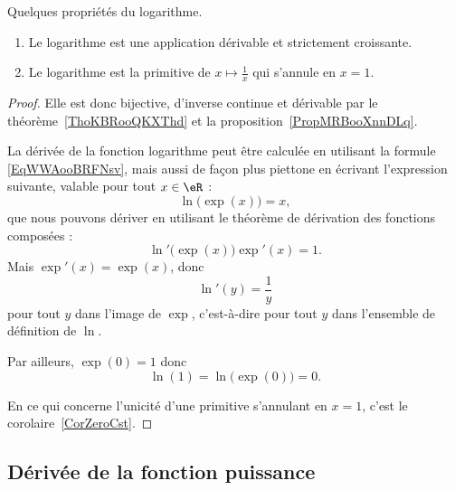 \begin{proposition}\label{ExZLMooMzYqfK}
    Quelques propriétés du logarithme.
    \begin{enumerate}
        \item
            Le logarithme est une application dérivable et strictement croissante.
        \item
            Le logarithme est la primitive de \( x\mapsto\frac{1}{ x }\) qui s'annule en \( x=1\).
    \end{enumerate}
\end{proposition}

\begin{proof}
    Elle est donc bijective, d'inverse continue et dérivable par le théorème~\ref{ThoKBRooQKXThd} et la proposition~\ref{PropMRBooXnnDLq}.

    La dérivée de la fonction logarithme peut être calculée en utilisant la formule \eqref{EqWWAooBRFNsv}, mais aussi de façon plus piettone en écrivant l'expression suivante, valable pour tout \( x\in \eR\) :
    \begin{equation}
        \ln\big( \exp(x) \big)=x,
    \end{equation}
    que nous pouvons dériver en utilisant le théorème de dérivation des fonctions composées :
    \begin{equation}
        \ln'\big( \exp(x) \big)\exp'(x)=1.
    \end{equation}
    Mais \( \exp'(x)=\exp(x)\), donc
    \begin{equation}
        \ln'(y)=\frac{1}{ y }
    \end{equation}
    pour tout \( y\) dans l'image de \( \exp\), c'est-à-dire pour tout \( y\) dans l'ensemble de définition de \( \ln\).

    Par ailleurs, \( \exp(0)=1\) donc
    \begin{equation}
        \ln(1)=\ln\big( \exp(0) \big)=0.
    \end{equation}

    En ce qui concerne l'unicité d'une primitive s'annulant en \( x=1\), c'est le corolaire~\ref{CorZeroCst}.
\end{proof}

\subsection{Dérivée de la fonction puissance}

